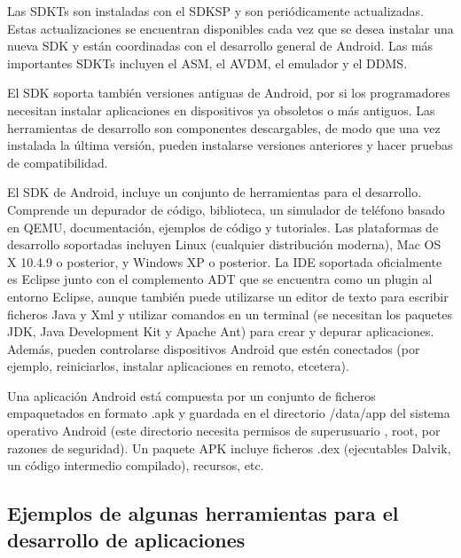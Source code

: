 Las \ac{SDKT}s son instaladas con el \ac{SDKSP} y son peri\'odicamente actualizadas. Estas actualizaciones se encuentran disponibles cada vez que se desea instalar una nueva \ac{SDK} y están coordinadas con el desarrollo general de Android. Las m\'as importantes \ac{SDKT}s incluyen el \ac{ASM}, el \ac{AVDM}, el emulador y el \ac{DDMS}.

El \ac{SDK} soporta tambi\'en versiones antiguas de Android, por si los programadores necesitan instalar aplicaciones en dispositivos ya obsoletos o m\'as antiguos. Las herramientas de desarrollo son componentes descargables, de modo que una vez instalada la \'ultima versi\'on, pueden instalarse versiones anteriores y hacer pruebas de compatibilidad.

El \ac{SDK} de Android, incluye un conjunto de herramientas para el desarrollo. Comprende un depurador de c\'odigo, biblioteca, un simulador de tel\'efono basado en QEMU, documentaci\'on, ejemplos de c\'odigo y tutoriales. Las plataformas de desarrollo soportadas incluyen Linux (cualquier distribuci\'on moderna), Mac OS X\Si{\texttrademark} 10.4.9 o posterior, y Windows XP\Si{\texttrademark} o posterior. La \ac{IDE} soportada oficialmente es Eclipse\Si{\texttrademark} junto con el complemento \ac{ADT} que se encuentra como un plugin al entorno Eclipse\Si{\texttrademark}, aunque tambi\'en puede utilizarse un editor de texto para escribir ficheros Java y Xml y utilizar comandos en un terminal (se necesitan los paquetes JDK, Java Development Kit y Apache Ant) para crear y depurar aplicaciones. Adem\'as, pueden controlarse dispositivos Android que est\'en conectados (por ejemplo, reiniciarlos, instalar aplicaciones en remoto, etcetera).~\cite{wiki.sdk}

Una aplicación Android est\'a compuesta por un conjunto de ficheros empaquetados en formato .apk y guardada en el directorio /data/app del sistema operativo Android (este directorio necesita permisos de superusuario , root, por razones de seguridad). Un paquete APK incluye ficheros .dex (ejecutables Dalvik, un c\'odigo intermedio compilado), recursos, etc.

\subsection{Ejemplos de algunas herramientas para el desarrollo de aplicaciones}
\label{subsec:android.tools.examples.1}

